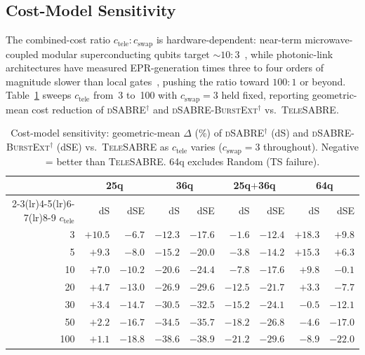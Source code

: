\documentclass[conference]{IEEEtran}
\newcommand{\dSABRE}{\textsc{dSABRE}}
\newcommand{\BurstExt}{\textsc{dSABRE-BurstExt}}
\newcommand{\TeleSABRE}{\textsc{TeleSABRE}}
\begin{document}
\subsection{Cost-Model Sensitivity}
\label{sec:sensitivity}

The combined-cost ratio $c_{\mathrm{tele}}{:}c_{\mathrm{swap}}$ is
hardware-dependent: near-term microwave-coupled modular superconducting
qubits target ${\sim}10{:}3$~\cite{cuomo2020towards}, while photonic-link
architectures have measured EPR-generation times three to four orders of
magnitude slower than local gates~\cite{stephenson2020high,daiss2021quantum},
pushing the ratio toward $100{:}1$ or beyond.
Table~\ref{tab:sensitivity} sweeps $c_{\mathrm{tele}}$ from~3 to~100
with $c_{\mathrm{swap}}=3$ held fixed, reporting geometric-mean cost
reduction of \dSABRE$^{\dagger}$ and \BurstExt$^{\dagger}$ vs.\
\TeleSABRE{}.

\begin{table}[t]
\centering
\caption{Cost-model sensitivity: geometric-mean $\Delta$ (\%) of
  \dSABRE$^{\dagger}$ (dS) and \BurstExt$^{\dagger}$ (dSE) vs.\
  \TeleSABRE{} as $c_{\mathrm{tele}}$ varies ($c_{\mathrm{swap}}=3$
  throughout).  Negative = better than \TeleSABRE{}.
  64q excludes Random (TS failure).}
\label{tab:sensitivity}
\setlength{\tabcolsep}{4pt}
\begin{tabular}{@{}r rr rr rr rr@{}}
\toprule
 & \multicolumn{2}{c}{25q} & \multicolumn{2}{c}{36q}
 & \multicolumn{2}{c}{25q$+$36q} & \multicolumn{2}{c}{64q} \\
\cmidrule(lr){2-3}\cmidrule(lr){4-5}\cmidrule(lr){6-7}\cmidrule(lr){8-9}
$c_{\mathrm{tele}}$ & dS & dSE & dS & dSE & dS & dSE & dS & dSE \\
\midrule
  3 & $+10.5$ & $\mathbf{-6.7}$  & $-12.3$ & $\mathbf{-17.6}$ & $-1.6$  & $\mathbf{-12.4}$ & $+18.3$ & $+9.8$  \\
  5 & $+9.3$  & $\mathbf{-8.0}$  & $-15.2$ & $\mathbf{-20.0}$ & $-3.8$  & $\mathbf{-14.2}$ & $+15.3$ & $+6.3$  \\
 10 & $+7.0$  & $\mathbf{-10.2}$ & $-20.6$ & $\mathbf{-24.4}$ & $-7.8$  & $\mathbf{-17.6}$ & $+9.8$  & $\mathbf{-0.1}$  \\
 20 & $+4.7$  & $\mathbf{-13.0}$ & $-26.9$ & $\mathbf{-29.6}$ & $-12.5$ & $\mathbf{-21.7}$ & $+3.3$  & $\mathbf{-7.7}$  \\
 30 & $+3.4$  & $\mathbf{-14.7}$ & $-30.5$ & $\mathbf{-32.5}$ & $-15.2$ & $\mathbf{-24.1}$ & $-0.5$  & $\mathbf{-12.1}$ \\
 50 & $+2.2$  & $\mathbf{-16.7}$ & $-34.5$ & $\mathbf{-35.7}$ & $-18.2$ & $\mathbf{-26.8}$ & $-4.6$  & $\mathbf{-17.0}$ \\
100 & $+1.1$  & $\mathbf{-18.8}$ & $-38.6$ & $\mathbf{-38.9}$ & $-21.2$ & $\mathbf{-29.6}$ & $-8.9$  & $\mathbf{-22.0}$ \\
\bottomrule
\end{tabular}
\end{table}
\end{document}
